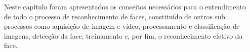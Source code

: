 \begin{comment}
\subsection{EigenVectors para EigenFaces}\label{subsec:vectoface}

O transformação dos valores numéricos gerados na ACP para imagens EigenFaces nao são necessário para os algoritmos apresentados. Essa transformação serve apenas para satisfazer olhos humanos, ou seja, uma tentativa de observar em imagens os valores gerados pela teoria.


Essencialmente, deve-se converter a imagem para um conjunto de dados, como os vetores $ x $ e $ y $ apresentados na \autoref{tabelaxy}, e performar o algoritmo ACP como descrito anteriormente. A translação de uma imagem para um conjunto de dados é feita tratando esta como um vetor de duas dimensões, e em seguida mapear para um vetor unidimensional como sugere a \autoref{fig:2dto1d}:

\begin{figure}[h]
\centering
\texttt{[image: 2dto1d]}
\caption{Conversão de imagem para conjunto de dados. A variável $P$ seria a representação de um pixel.}
\fonte{\cite{drmathew_java_programming}}
\label{fig:2dto1d}
\end{figure}

Supondo que a imagem tem o tamanho de 200x200 pixels em escala de cinza, o conjunto de dados resultante residirá em um \textit{eigenspace} de 40 mil dimensões, o que acarretará na geração de 40 mil \textit{eigenvectors}, cuja a maioria possui um \textit{eigenvalue} desconsiderável ou insignificante, podendo assim ser descartados. Isto facilitará o processamento da imagem e a utilização da técnica. 

Em geral, supondo que uma imagem quadrada em escala de cinza tem o tamanho de  $ N $ pixels, então $N^2$ eigenvetors serão criados. No seguinte exemplo, será assumido que existem $ M $ imagens:

A técnica consiste em "dividir" a matriz de covariância que é ($ N^2 x N^2 $) em duas matrizes de ($ N^2 x M $) e ($ M x N^2 $). 


\end{comment}







Neste capítulo foram apresentados os conceitos necessários para o entendimento de todo o processo de reconhecimento de faces, constituído de outros sub processos como aquisição de imagem e vídeo, processamento e  classificação de imagens, detecção da face, treinamento e, por fim, o reconhecimento efetivo da face.

